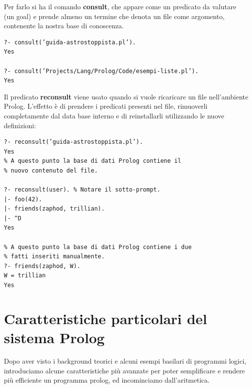 Per farlo si ha il comando \textbf{consult}, che appare come un predicato da valutare (un goal) e prende almeno un termine che denota un file
come argomento, contenente la nostra base di conoscenza.
\begin{verbatim}
?- consult(’guida-astrostoppista.pl’).
Yes

?- consult(’Projects/Lang/Prolog/Code/esempi-liste.pl’).
Yes
\end{verbatim}
Il predicato \textbf{reconsult} viene usato quando si vuole ricaricare un file nell'ambiente Prolog.\newline
L’effetto è di prendere i predicati presenti nel file, rimuoverli completamente dal data base interno
e di reinstallarli utilizzando le nuove definizioni:
\begin{verbatim}
?- reconsult(’guida-astrostoppista.pl’).
Yes
% A questo punto la base di dati Prolog contiene il
% nuovo contenuto del file.

?- reconsult(user). % Notare il sotto-prompt.
|- foo(42).
|- friends(zaphod, trillian).
|- ^D
Yes

% A questo punto la base di dati Prolog contiene i due
% fatti inseriti manualmente.
?- friends(zaphod, W).
W = trillian
Yes
\end{verbatim}

\section{Caratteristiche particolari del sistema Prolog}
Dopo aver visto i background teorici e alcuni esempi basilari di programmi logici, introduciamo alcune caratteristiche più avanzate
per poter semplificare e rendere più efficiente un programma prolog, ed incominciamo dall'aritmetica.
